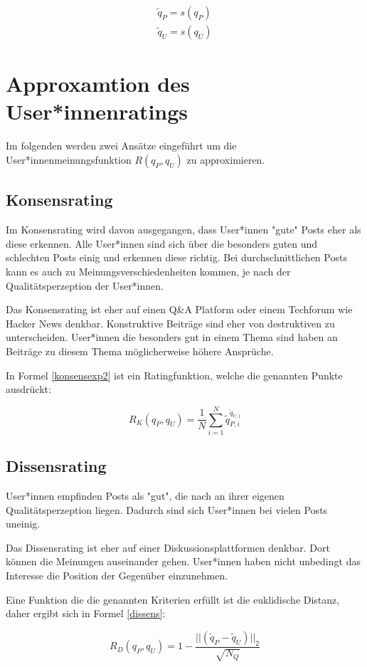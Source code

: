 \begin{align}
\tilde{q}_P = s(q_P) \\
\tilde{q}_U = s(q_U) 
\end{align}

\section{Approxamtion des User*innenratings}

Im folgenden werden zwei Ansätze eingeführt um die User*innenmeinungsfunktion $R(q_P,q_U)$ zu approximieren.
 
\subsection{Konsensrating}

Im Konsensrating wird davon ausgegangen, dass User*innen "gute" Posts eher als diese erkennen. Alle User*innen sind sich über die besonders guten und schlechten Posts einig und erkennen diese richtig. Bei durchschnittlichen Posts kann es auch zu Meinungsverschiedenheiten kommen, je nach der Qualitätsperzeption der User*innen.

Das Konsensrating ist eher auf einen Q\&A Platform oder einem Techforum wie Hacker News denkbar. Konstruktive Beiträge sind eher von destruktiven zu unterscheiden. User*innen die besonders gut in einem Thema sind haben an Beiträge zu diesem Thema möglicherweise höhere Ansprüche.


In Formel \ref{konsensexp2} ist ein Ratingfunktion, welche die genannten Punkte ausdrückt:

\begin{equation}
\label{konsensexp2}
R_K(q_P,q_U) = \frac{1}{N}\sum_{i = 1}^{N}\tilde{q}_{P,i}^{\tilde{q}_{U,i}}
\end{equation}



\subsection{Dissensrating}

User*innen empfinden Posts als "gut", die nach an ihrer eigenen Qualitätsperzeption liegen. Dadurch sind sich User*innen bei vielen Posts uneinig.

Das Dissensrating ist eher auf einer Diskussionsplattformen denkbar. Dort können die Meinungen auseinander gehen. User*innen haben nicht unbedingt das Interesse die Position der Gegenüber einzunehmen. 

Eine Funktion die die genannten Kriterien erfüllt ist die euklidische Distanz, daher ergibt sich in Formel \ref{dissens}:


\begin{equation}
\label{dissens}
R_D(q_P,q_U) = 1 - \frac{||(\tilde{q}_P - \tilde{q}_U)||_2}{\sqrt{N_Q}}
\end{equation}
